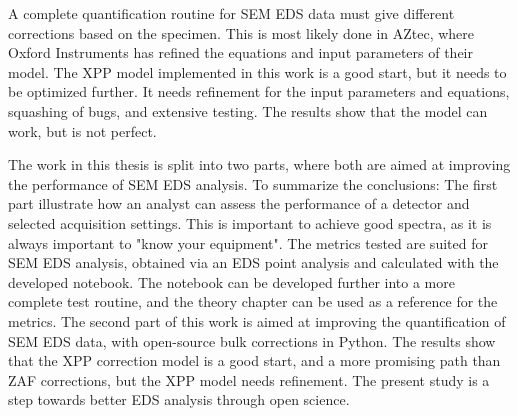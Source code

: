 A complete quantification routine for SEM EDS data must give different corrections based on the specimen.
This is most likely done in AZtec, where Oxford Instruments has refined the equations and input parameters of their model.
The XPP model implemented in this work is a good start, but it needs to be optimized further.
It needs refinement for the input parameters and equations, squashing of bugs, and extensive testing.
The results show that the model can work, but is not perfect.



The work in this thesis is split into two parts, where both are aimed at improving the performance of SEM EDS analysis.
To summarize the conclusions:
The first part illustrate how an analyst can assess the performance of a detector and selected acquisition settings.
This is important to achieve good spectra, as it is always important to "know your equipment".
The metrics tested are suited for SEM EDS analysis, obtained via an EDS point analysis and calculated with the developed notebook.
The notebook can be developed further into a more complete test routine, and the theory chapter can be used as a reference for the metrics.
The second part of this work is aimed at improving the quantification of SEM EDS data, with open-source bulk corrections in Python.
The results show that the XPP correction model is a good start, and a more promising path than ZAF corrections, but the XPP model needs refinement.
The present study is a step towards better EDS analysis through open science.
